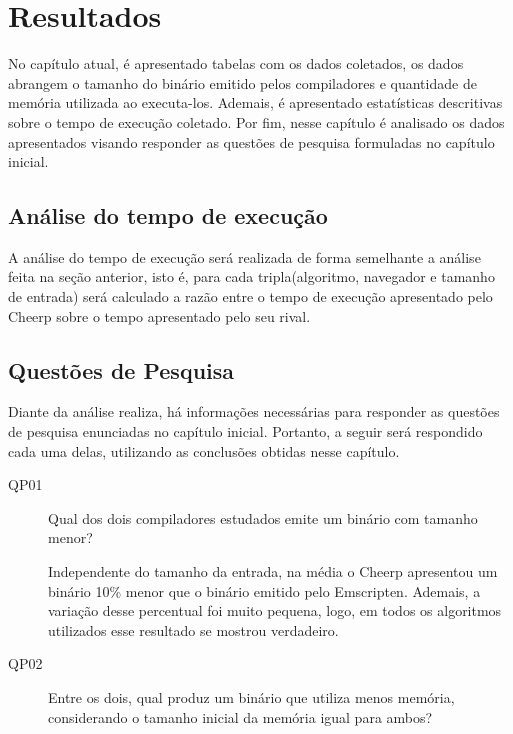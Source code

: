 
\chapter{Resultados}\label{resultados}

No capítulo atual, é apresentado tabelas com os dados coletados, os dados abrangem o tamanho do binário emitido pelos compiladores e quantidade de memória utilizada ao executa-los. Ademais, é apresentado estatísticas descritivas sobre o tempo de execução coletado. Por fim, nesse capítulo é analisado os dados apresentados visando responder as questões de pesquisa formuladas no capítulo inicial.

\section{Análise do tempo de execução}

A análise do tempo de execução será realizada de forma semelhante a análise feita na seção anterior, isto é, para cada tripla(algoritmo, navegador e tamanho de entrada) será calculado a razão entre o tempo de execução apresentado pelo Cheerp sobre o tempo apresentado pelo seu rival.



\section{Questões de Pesquisa}

Diante da análise realiza, há informações necessárias para responder as questões de pesquisa enunciadas no capítulo inicial. Portanto, a seguir será respondido cada uma delas, utilizando as conclusões obtidas nesse capítulo.

\begin{description}
    \item[QP01] Qual dos dois compiladores estudados emite um binário com tamanho menor?

    Independente do tamanho da entrada, na média o Cheerp apresentou um binário 10\% menor que o binário emitido pelo Emscripten. Ademais, a variação desse percentual foi muito pequena, logo, em todos os algoritmos utilizados esse resultado se mostrou verdadeiro.

    \item[QP02] Entre os dois, qual produz um binário que utiliza menos memória, considerando o tamanho inicial da memória igual para ambos?
\end{description}











